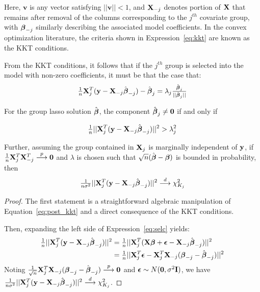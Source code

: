 Here, $\mathbf{v}$ is any vector satisfying $||\mathbf{v}|| < 1$, and $\mathbf{X}_{-j}$ denotes portion of $\mathbf{X}$ that remains after removal of the columns corresponding to the $j^{th}$ covariate group, with $\boldsymbol{\beta}_{-j}$ similarly describing the associated model coefficients. In the convex optimization literature, the criteria shown in Expression~\ref{eq:kkt} are known as the KKT conditions. 

From the KKT conditions, it follows that if the $j^{th}$ group is selected into the model with non-zero coefficients, it must be that the case that:
\begin{equation}
\label{eq:post_kkt}
\tfrac{1}{n}\mathbf{X}_j^T(\mathbf{y} - \mathbf{X}_{-j}\hat{\boldsymbol{\beta}}_{-j}) - \hat{\boldsymbol{\beta}}_j = \lambda_j\tfrac{\hat{\boldsymbol{\beta}}_j}{||\hat{\boldsymbol{\beta}}_j||}
\end{equation}

\begin{theorem}
\label{Thm:main}
For the group lasso solution $\hat{\boldsymbol{\beta}}$, the component $\hat{\boldsymbol{\beta}}_j \ne \mathbf{0}$ if and only if

\begin{equation}
\label{eq:selc}
\tfrac{1}{n}||\mathbf{X}_j^T(\mathbf{y} - \mathbf{X}_{-j}\hat{\boldsymbol{\beta}}_{-j})||^2 > \lambda_j^2
\end{equation}

Further, assuming the group contained in $\mathbf{X}_j$ is marginally independent of $\mathbf{y}$, if $\tfrac{1}{n}\mathbf{X}_j^T \mathbf{X}_{-j}^T \overset{p}{\longrightarrow} \mathbf{0}$ and $\lambda$ is chosen such that $\sqrt{n}(\hat{\boldsymbol{\beta}} - \boldsymbol{\beta})$ is bounded in probability, then
\begin{equation}
\label{eq:thm1}
\tfrac{1}{n \sigma^2}||\mathbf{X}_j^T(\mathbf{y} - \mathbf{X}_{-j}\hat{\boldsymbol{\beta}}_{-j})||^2 \overset{d}{\longrightarrow} \chi^2_{K_j}
\end{equation}
\end{theorem}

\begin{proof}
The first statement is a straightforward algebraic manipulation of Equation~\ref{eq:post_kkt} and a direct consequence of the KKT conditions. 

Then, expanding the left side of Expression~\ref{eq:selc} yields:
\begin{align}
\begin{alignedat}{2}
\tfrac{1}{n}||\mathbf{X}_j^T(\mathbf{y} - \mathbf{X}_{-j}\hat{\boldsymbol{\beta}}_{-j})||^2 &= \tfrac{1}{n}||\mathbf{X}_j^T(\mathbf{X}\boldsymbol{\beta} + \boldsymbol{\epsilon} - \mathbf{X}_{-j}\hat{\boldsymbol{\beta}}_{-j})||^2 \\
&= \tfrac{1}{n}||\mathbf{X}_j^T\boldsymbol{\epsilon} - \mathbf{X}_j^T\mathbf{X}_{-j}(\boldsymbol{\beta}_{-j} - \hat{\boldsymbol{\beta}}_{-j})||^2 
\end{alignedat}
\end{align}
Noting $\tfrac{1}{\sqrt{n}} \mathbf{X}_j^T\mathbf{X}_{-j}(\boldsymbol{\beta}_{-j} - \hat{\boldsymbol{\beta}}_{-j}) \overset{p}{\longrightarrow} \mathbf{0}$ and $\boldsymbol{\epsilon} \sim N(\mathbf{0},\sigma^2\mathbf{I})$, we have $\tfrac{1}{n \sigma^2}||\mathbf{X}_j^T(\mathbf{y} - \mathbf{X}_{-j}\hat{\boldsymbol{\beta}}_{-j})||^2 \overset{d}{\longrightarrow} \chi^2_{K_j}$.
\end{proof}


